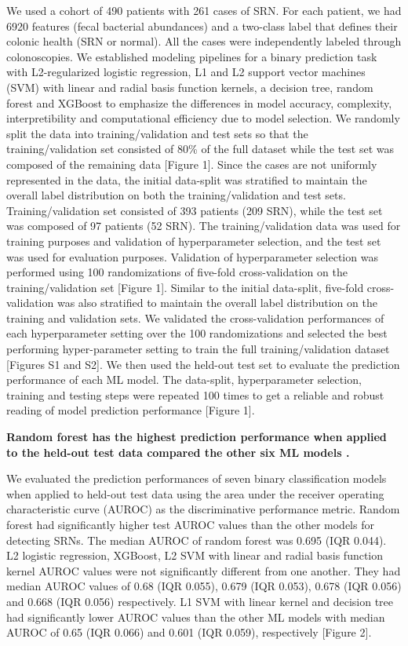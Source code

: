 \documentclass[11pt,]{article}
\begin{document}
We used a cohort of 490 patients with 261 cases of SRN. For each
patient, we had 6920 features (fecal bacterial abundances) and a
two-class label that defines their colonic health (SRN or normal). All
the cases were independently labeled through colonoscopies. We
established modeling pipelines for a binary prediction task with
L2-regularized logistic regression, L1 and L2 support vector machines
(SVM) with linear and radial basis function kernels, a decision tree,
random forest and XGBoost to emphasize the differences in model
accuracy, complexity, interpretibility and computational efficiency due
to model selection. We randomly split the data into training/validation
and test sets so that the training/validation set consisted of 80\% of
the full dataset while the test set was composed of the remaining data
{[}Figure 1{]}. Since the cases are not uniformly represented in the
data, the initial data-split was stratified to maintain the overall
label distribution on both the training/validation and test sets.
Training/validation set consisted of 393 patients (209 SRN), while the
test set was composed of 97 patients (52 SRN). The training/validation
data was used for training purposes and validation of hyperparameter
selection, and the test set was used for evaluation purposes. Validation
of hyperparameter selection was performed using 100 randomizations of
five-fold cross-validation on the training/validation set {[}Figure
1{]}. Similar to the initial data-split, five-fold cross-validation was
also stratified to maintain the overall label distribution on the
training and validation sets. We validated the cross-validation
performances of each hyperparameter setting over the 100 randomizations
and selected the best performing hyper-parameter setting to train the
full training/validation dataset {[}Figures S1 and S2{]}. We then used
the held-out test set to evaluate the prediction performance of each ML
model. The data-split, hyperparameter selection, training and testing
steps were repeated 100 times to get a reliable and robust reading of
model prediction performance {[}Figure 1{]}.

\textbf{Random forest has the highest prediction performance when
applied to the held-out test data compared the other six ML models .}

We evaluated the prediction performances of seven binary classification
models when applied to held-out test data using the area under the
receiver operating characteristic curve (AUROC) as the discriminative
performance metric. Random forest had significantly higher test AUROC
values than the other models for detecting SRNs. The median AUROC of
random forest was 0.695 (IQR 0.044). L2 logistic regression, XGBoost, L2
SVM with linear and radial basis function kernel AUROC values were not
significantly different from one another. They had median AUROC values
of 0.68 (IQR 0.055), 0.679 (IQR 0.053), 0.678 (IQR 0.056) and 0.668 (IQR
0.056) respectively. L1 SVM with linear kernel and decision tree had
significantly lower AUROC values than the other ML models with median
AUROC of 0.65 (IQR 0.066) and 0.601 (IQR 0.059), respectively {[}Figure
2{]}.
\end{document}
